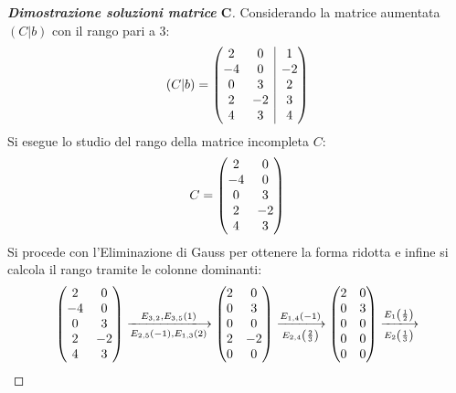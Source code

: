 \documentclass[a4paper]{article}
\makeatletter
\newenvironment{rowequmat}[1]{\left(\array{@{}#1@{}}}{\endarray\right)}
\makeatother
\begin{document}
	\begin{proof}[\textbf{Dimostrazione soluzioni matrice} $\boldsymbol{C}$]
		Considerando la matrice aumentata $\left(C|b\right)$ con il rango pari a $3$:
		\begin{equation*}
			\left(C|b\right) = \begin{rowequmat}{cc|c}
				2 & 0 & 1 \\
				-4 & 0 & -2 \\
				0 & 3 & 2 \\
				2 & -2 & 3 \\
				4 & 3 & 4
			\end{rowequmat}
		\end{equation*}
		Si esegue lo studio del rango della matrice incompleta $C$:
		\begin{equation*}
			C = \begin{rowequmat}{cc}
				2 & 0 \\
				-4 & 0 \\
				0 & 3 \\
				2 & -2 \\
				4 & 3
			\end{rowequmat}
		\end{equation*}
		Si procede con l'Eliminazione di Gauss per ottenere la forma ridotta e infine si calcola il rango tramite le colonne dominanti:
		\begin{gather*}
			\begin{rowequmat}{cc}
				2 & 0 \\
				-4 & 0 \\
				0 & 3 \\
				2 & -2 \\
				4 & 3
			\end{rowequmat} \xlongrightarrow[E_{2,5}\left(-1\right), E_{1,3}\left(2\right)]{E_{3,2}, E_{3,5}\left(1\right)}
			\begin{rowequmat}{cc}
				2 & 0 \\
				0 & 3 \\
				0 & 0 \\
				2 & -2 \\
				0 & 0
			\end{rowequmat} \xlongrightarrow[E_{2,4}\left(\frac{2}{3}\right)]{E_{1,4}\left(-1\right)}
			\begin{rowequmat}{cc}
				2 & 0 \\
				0 & 3 \\
				0 & 0 \\
				0 & 0 \\
				0 & 0
			\end{rowequmat} \xlongrightarrow[E_{2}\left(\frac{1}{3}\right)]{E_{1}\left(\frac{1}{2}\right)}

\end{gather*}
\end{proof}
\end{document}
